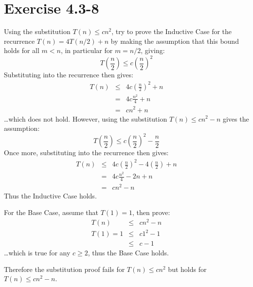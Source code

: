 \documentclass{article}
\begin{document}
\section*{Exercise 4.3-8}

Using the substitution $T(n) \leq cn^2$, try to prove the Inductive Case for the recurrence $T(n) = 4T(n/2) + n$ by making the assumption that this bound holds for all $m < n$, in particular for $m = n/2$, giving:
\begin{equation*}
	T\left(\frac{n}{2}\right) \leq c\left(\frac{n}{2}\right)^2
\end{equation*}
Substituting into the recurrence then gives:
\begin{eqnarray*}
	T(n) &\leq& 4c\left(\frac{n}{2}\right)^2 + n \\
	 &=& 4c\frac{n^2}{4} + n \\
	 &=& cn^2 + n
\end{eqnarray*}
\ldots which does not hold.  However, using the substitution $T(n) \leq cn^2 - n$ gives the assumption:
\begin{equation*}
	T\left(\frac{n}{2}\right) \leq c\left(\frac{n}{2}\right)^2 - \frac{n}{2}
\end{equation*}
Once more, substituting into the recurrence then gives:
\begin{eqnarray*}
	T(n) &\leq& 4c\left(\frac{n}{2}\right)^2 - 4\left(\frac{n}{2}\right) + n \\
	 &=& 4c \frac{n^2}{4} - 2n + n \\
	 &=& cn^2 - n
\end{eqnarray*}
Thus the Inductive Case holds.

For the Base Case, assume that $T(1) = 1$, then prove:
\begin{eqnarray*}
	T(n) &\leq& cn^2 - n \\
	T(1) = 1 &\leq& c1^2 - 1 \\
	 &\leq& c - 1
\end{eqnarray*}
\ldots which is true for any $c \geq 2$, thus the Base Case holds.

Therefore the substitution proof fails for $T(n) \leq cn^2$ but holds for $T(n) \leq cn^2 - n$.
\end{document}
